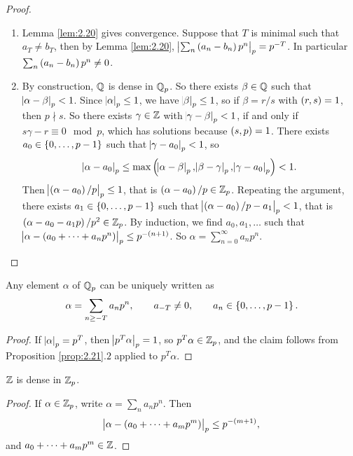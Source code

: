 \begin{proof}
\hfill
\begin{enumerate}
\item Lemma \ref{lem:2.20} gives convergence. Suppose that $ T $ is minimal such that $ a_T \ne b_T $, then by Lemma \ref{lem:2.20}, $ \abs{\sum_n \br{a_n - b_n}p^n}_p = p^{-T} $. In particular $ \sum_n \br{a_n - b_n}p^n \ne 0 $.
\item By construction, $ \mathbb{Q} $ is dense in $ \mathbb{Q}_p $. So there exists $ \beta \in \mathbb{Q} $ such that $ \abs{\alpha - \beta}_p < 1 $. Since $ \abs{\alpha}_p \le 1 $, we have $ \abs{\beta}_p \le 1 $, so if $ \beta = r / s $ with $ \br{r, s} = 1 $, then $ p \nmid s $. So there exists $ \gamma \in \mathbb{Z} $ with $ \abs{\gamma - \beta}_p < 1 $, if and only if $ s\gamma - r \equiv 0 \mod p $, which has solutions because $ \br{s, p} = 1 $. There exists $ a_0 \in \cbr{0, \dots, p - 1} $ such that $ \abs{\gamma - a_0}_p < 1 $, so
$$ \abs{\alpha - a_0}_p \le \max\br{\abs{\alpha - \beta}_p, \abs{\beta - \gamma}_p, \abs{\gamma - a_0}_p} < 1. $$
Then $ \abs{\br{\alpha - a_0} / p}_p \le 1 $, that is $ \br{\alpha - a_0} / p \in \ZZ_p $. Repeating the argument, there exists $ a_1 \in \cbr{0, \dots, p - 1} $ such that $ \abs{\br{\alpha - a_0} / p - a_1}_p < 1 $, that is $ \br{\alpha - a_0 - a_1p} / p^2 \in \ZZ_p $. By induction, we find $ a_0, a_1, \dots $ such that $ \abs{\alpha - \br{a_0 + \dots + a_np^n}}_p \le p^{-\br{n + 1}} $. So $ \alpha = \sum_{n = 0}^\infty a_np^n $.
\end{enumerate}
\end{proof}

\begin{corollary}
Any element $ \alpha $ of $ \mathbb{Q}_p $ can be uniquely written as
$$ \alpha = \sum_{n \ge -T} a_np^n, \qquad a_{-T} \ne 0, \qquad a_n \in \cbr{0, \dots, p - 1}. $$
\end{corollary}

\begin{proof}
If $ \abs{\alpha}_p = p^T $, then $ \abs{p^T\alpha}_p = 1 $, so $ p^T\alpha \in \mathbb{Z}_p $, and the claim follows from Proposition \ref{prop:2.21}.$ 2 $ applied to $ p^T\alpha $.
\end{proof}

\begin{corollary}
$ \mathbb{Z} $ is dense in $ \mathbb{Z}_p $.
\end{corollary}

\begin{proof}
If $ \alpha \in \mathbb{Z}_p $, write $ \alpha = \sum_n a_np^n $. Then
$$ \abs{\alpha - \br{a_0 + \dots + a_mp^m}}_p \le p^{-\br{m + 1}}, $$
and $ a_0 + \dots + a_mp^m \in \mathbb{Z} $.
\end{proof}

